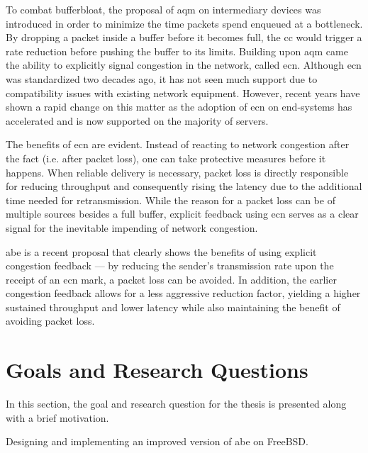 To combat bufferbloat, the proposal of \gls{aqm} on intermediary devices was introduced in order to minimize the time packets spend enqueued at a bottleneck. By dropping a packet inside a buffer before it becomes full, the \gls{cc} would trigger a rate reduction before pushing the buffer to its limits. Building upon \gls{aqm} came the ability to explicitly signal congestion in the network, called \gls{ecn}. Although \gls{ecn} was standardized two decades ago, it has not seen much support due to compatibility issues with existing network equipment. However, recent years have shown a rapid change on this matter as the adoption of \gls{ecn} on end-systems has accelerated and is now supported on the majority of servers. \cite{enabling_internet-wide_ecn}

The benefits of \gls{ecn} are evident. Instead of reacting to network congestion after the fact (i.e. after packet loss), one can take protective  measures before it happens. When reliable delivery is necessary, packet loss is directly responsible for reducing throughput and consequently rising the latency due to the additional time needed for retransmission. While the reason for a packet loss can be of multiple sources besides a full buffer, explicit feedback using \gls{ecn} serves as a clear signal for the inevitable impending of network congestion.

\gls{abe} \cite{abe} is a recent proposal  that clearly shows the benefits of using explicit congestion feedback --- by reducing the sender's transmission rate upon the receipt of an \gls{ecn} mark, a packet loss can be avoided. In addition, the earlier congestion feedback allows for a less aggressive reduction factor, yielding a higher sustained throughput and lower latency while also maintaining the benefit of avoiding packet loss.









\section{Goals and Research Questions} \label{goals_and_research_questions}

In this section, the goal and research question for the thesis is presented along with a brief motivation.

\begin{statement}
    Designing and implementing an improved version of \gls{abe} on FreeBSD.
\end{statement}

